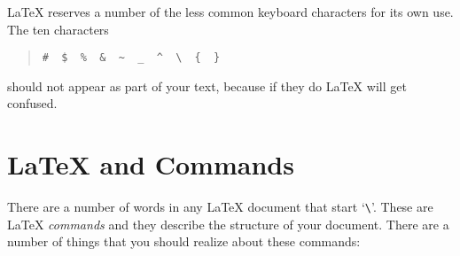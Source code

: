 \LaTeX{} reserves a number of the less common keyboard characters for its
own use. The ten characters
\begin{quote}\begin{verbatim}
#  $  %  &  ~  _  ^  \  {  }
\end{verbatim}\end{quote}
should not appear as part of your text, because if they do
\LaTeX{} will get confused.
 
\section{\LaTeX{} and \uicthesi{} Commands}
There are a number of words in any \LaTeX{} document that
start `\verb+\+'.
These are \LaTeX{} {\em commands\/} and they describe the structure
of your document.
There are a number of things that you should realize about these
commands:
